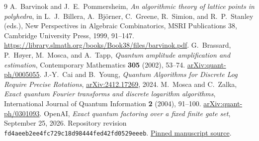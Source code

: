 \documentclass[11pt,reqno]{amsart}
\numberwithin{equation}{section}
\theoremstyle{definition}
\theoremstyle{remark}
\begin{document}
\begin{thebibliography}{9}
 A.~Barvinok and J.~E.~Pommersheim,
\emph{An algorithmic theory of lattice points in polyhedra},
in L.~J.~Billera, A.~Bj\"orner, C.~Greene, R.~Simion, and
R.~P.~Stanley (eds.), New Perspectives in Algebraic Combinatorics,
MSRI Publications 38,
Cambridge University Press, 1999, 91--147.
\url{https://library.slmath.org/books/Book38/files/barvinok.pdf}.
 G.~Brassard, P.~H\o yer, M.~Mosca, and A.~Tapp,
\emph{Quantum amplitude amplification and estimation},
Contemporary Mathematics \textbf{305} (2002), 53--74.
\href{https://arxiv.org/abs/quant-ph/0005055}{arXiv:quant-ph/0005055}.
 J.-Y.~Cai and B.~Young,
\emph{Quantum Algorithms for Discrete Log Require Precise Rotations},
\href{https://arxiv.org/abs/2412.17269}{arXiv:2412.17269}, 2024.
 M.~Mosca and C.~Zalka,
\emph{Exact quantum Fourier transforms and discrete logarithm algorithms},
International Journal of Quantum Information \textbf{2} (2004), 91--100.
\href{https://arxiv.org/abs/quant-ph/0301093}{arXiv:quant-ph/0301093}.
 OpenAI,
\emph{Exact quantum factoring over a fixed finite gate set},
September 25, 2026. Repository revision
\texttt{fd4aeeb2ee4fc729c18d98444fed42fd0529eeeb}.
\href{https://github.com/openai/math/tree/fd4aeeb2ee4fc729c18d98444fed42fd0529eeeb/preprints/Exact-quantum-factoring-over-a-fixed-finite-gate-set-September-25-2026}{Pinned manuscript source}.
\end{thebibliography}
\end{document}
